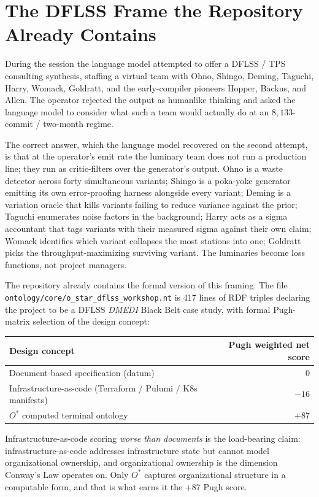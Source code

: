 \documentclass[11pt,letterpaper]{article}
\begin{document}
\section{The DFLSS Frame the Repository Already Contains}

During the session the language model attempted to offer a DFLSS / TPS consulting synthesis, staffing a virtual team with Ohno, Shingo, Deming, Taguchi, Harry, Womack, Goldratt, and the early-compiler pioneers Hopper, Backus, and Allen. The operator rejected the output as humanlike thinking and asked the language model to consider what such a team would actually do at an $8{,}133$-commit / two-month regime.

The correct answer, which the language model recovered on the second attempt, is that at the operator's emit rate the luminary team does not run a production line; they run as critic-filters over the generator's output. Ohno is a waste detector across forty simultaneous variants; Shingo is a poka-yoke generator emitting its own error-proofing harness alongside every variant; Deming is a variation oracle that kills variants failing to reduce variance against the prior; Taguchi enumerates noise factors in the background; Harry acts as a sigma accountant that tags variants with their measured sigma against their own claim; Womack identifies which variant collapses the most stations into one; Goldratt picks the throughput-maximizing surviving variant. The luminaries become loss functions, not project managers.

The repository already contains the formal version of this framing. The file \texttt{ontology/core/o\_star\_dflss\_workshop.nt} is 417 lines of RDF triples declaring the project to be a DFLSS \emph{DMEDI} Black Belt case study, with formal Pugh-matrix selection of the design concept:

\begin{center}
\begin{tabular}{@{}lr@{}}
\toprule
\textbf{Design concept} & \textbf{Pugh weighted net score} \\
\midrule
Document-based specification (datum) & $\phantom{+}0$ \\
Infrastructure-as-code (Terraform / Pulumi / K8s manifests) & $-16$ \\
$O^{\ast}$ computed terminal ontology & $+87$ \\
\bottomrule
\end{tabular}
\end{center}

Infrastructure-as-code scoring \emph{worse than documents} is the load-bearing claim: infrastructure-as-code addresses infrastructure state but cannot model organizational ownership, and organizational ownership is the dimension Conway's Law operates on. Only $O^{\ast}$ captures organizational structure in a computable form, and that is what earns it the $+87$ Pugh score.
\end{document}
